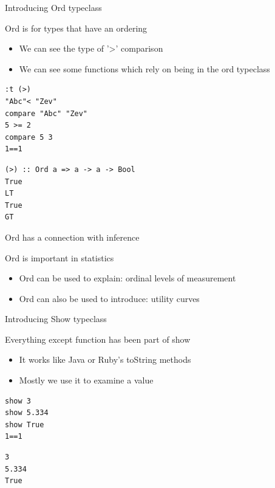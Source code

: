 \documentclass[presetation]{beamer}
\begin{document}
\begin{frame}[fragile,label={sec:org64a02d3}]{Introducing Ord typeclass}
 \begin{block}{Ord is for types that have an ordering}
\begin{itemize}
\item We can see the type of '>' comparison
\item We can see some functions which rely on being in the ord typeclass
\end{itemize}
\begin{verbatim}
:t (>)
"Abc"< "Zev"
compare "Abc" "Zev"
5 >= 2
compare 5 3
1==1
\end{verbatim}

\begin{verbatim}
(>) :: Ord a => a -> a -> Bool
True
LT
True
GT
\end{verbatim}
\end{block}
\end{frame}


\begin{frame}[label={sec:org9a60324}]{Ord has a connection with inference}
\begin{block}{Ord is important in statistics}
\begin{itemize}
\item Ord can be used to explain: \alert{ordinal levels of measurement}
\end{itemize}
\pause
\begin{itemize}
\item Ord can also be used to introduce: \alert{utility curves}
\end{itemize}
\end{block}
\end{frame}


\begin{frame}[fragile,label={sec:org3fba922}]{Introducing Show typeclass}
 \begin{block}{Everything except function has been part of show}
\begin{itemize}
\item It works like Java or Ruby's toString methods
\item Mostly we use it to examine a value
\end{itemize}
\begin{verbatim}
show 3
show 5.334
show True
1==1
\end{verbatim}

\begin{verbatim}
3
5.334
True
\end{verbatim}
\end{block}
\end{frame}
\end{document}
